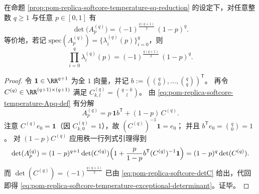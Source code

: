 \begin{theorem}\label{thm:pom-replica-softcore-temperature-exceptional-determinant}
在命题 \ref{prop:pom-replica-softcore-temperature-sq-reduction} 的设定下，对任意整数 \(q\ge 1\) 与任意 \(p\in[0,1]\) 有
\begin{equation}\label{eq:pom-replica-softcore-temperature-exceptional-determinant}
\boxed{\;
\det\!\bigl(A_p^{(q)}\bigr)=(-1)^{\frac{q(q+1)}{2}}\,(1-p)^{q}.\;}
\end{equation}
等价地，若记 \(\mathrm{spec}(A_p^{(q)})=\{\lambda_i^{(q)}(p)\}_{i=0}^{q}\)，则
\[
\prod_{i=0}^{q}\lambda_i^{(q)}(p)=(-1)^{\frac{q(q+1)}{2}}\,(1-p)^{q}.
\]
\end{theorem}
\begin{proof}
令 \(\mathbf{1}\in\RR^{q+1}\) 为全 \(1\) 向量，并记 \(b:=(\binom{q}{0},\dots,\binom{q}{q})^{\mathsf T}\)。
再令 \(C^{(q)}\in\RR^{(q+1)\times(q+1)}\) 满足 \(C^{(q)}_{k,l}=\binom{q-k}{l}\)。
由 \eqref{eq:pom-replica-softcore-temperature-Apq-def} 有分解
\[
A_p^{(q)}=p\,\mathbf{1}b^{\mathsf T}+(1-p)\,C^{(q)}.
\]
注意 \(C^{(q)}e_0=\mathbf{1}\)（因 \(C^{(q)}_{k,0}=1\)），故 \((C^{(q)})^{-1}\mathbf{1}=e_0\)；
并且 \(b^{\mathsf T}e_0=\binom{q}{0}=1\)。
对 \((1-p)C^{(q)}\) 应用秩一行列式引理得到
\[
\det(A_p^{(q)})
=(1-p)^{q+1}\det(C^{(q)})\Bigl(1+\frac{p}{1-p}b^{\mathsf T}(C^{(q)})^{-1}\mathbf{1}\Bigr)
=(1-p)^{q}\det(C^{(q)}).
\]
而 \(\det(C^{(q)})=(-1)^{\frac{q(q+1)}{2}}\) 已由 \eqref{eq:pom-replica-softcore-detC} 给出，代回即得 \eqref{eq:pom-replica-softcore-temperature-exceptional-determinant}。证毕。
\end{proof}


